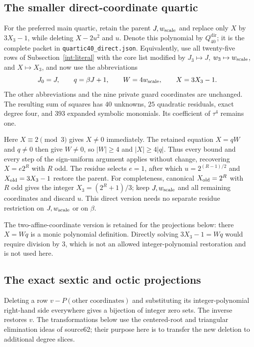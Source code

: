\subsection{The smaller direct-coordinate quartic}
\label{int:direct}

For the preferred main quartic, retain the parent $J,w_{\rm scale}$ and
replace only $X$ by $3X_3-1$, while deleting $X-2u^2$ and $u$.
Denote this polynomial by $Q_{40}^{\mathrm{dir}}$; it is the complete
packet in \texttt{quartic40\_direct.json}.
Equivalently, use all twenty-five rows of Subsection~\ref{int:literal}
with the core list modified by $J_3\mapsto J$, $w_3\mapsto w_{\rm scale}$,
and $X\mapsto X_3$, and now use the abbreviations
\[
 J_0=J,\qquad q=\beta J+1,\qquad W=4w_{\rm scale},
 \qquad X=3X_3-1.
\]
The other abbreviations and the nine private guard coordinates are
unchanged.  The resulting sum of squares has $40$ unknowns, $25$
quadratic residuals, exact degree four, and $393$ expanded symbolic
monomials.  Its coefficient of $\tau^4$ remains one.

Here $X\equiv2\pmod3$ gives $X\neq0$ immediately.  The retained equation
$X=qW$ and $q\neq0$ then give $W\neq0$, so $|W|\geq4$ and
$|X|\geq4|q|$.  Thus every bound and every step of the sign-uniform
argument applies without change, recovering $X=e2^R$ with $R$ odd.
The residue selects $e=1$, after which
$u=2^{(R-1)/2}$ and $X_{\rm old}=3X_3-1$ restore the parent.
For completeness, canonical $X_{\rm old}=2^R$ with $R$ odd gives the
integer $X_3=(2^R+1)/3$; keep $J,w_{\rm scale}$ and all remaining
coordinates and discard $u$.  This direct version needs no separate
residue restriction on $J,w_{\rm scale}$ or on $\beta$.

The two-affine-coordinate version is retained for the projections below:
there $X=Wq$ is a monic polynomial definition.  Directly solving
$3X_3-1=Wq$ would require division by $3$, which is not an allowed
integer-polynomial restoration and is not used here.

\subsection{The exact sextic and octic projections}
\label{int:projections}

Deleting a row $v-P(\text{other coordinates})$ and substituting its
integer-polynomial right-hand side everywhere gives a bijection of integer
zero sets.  The inverse restores $v$.  The transformations below use the
centered-root and triangular elimination ideas of source62; their purpose
here is to transfer the new deletion to additional degree slices.


